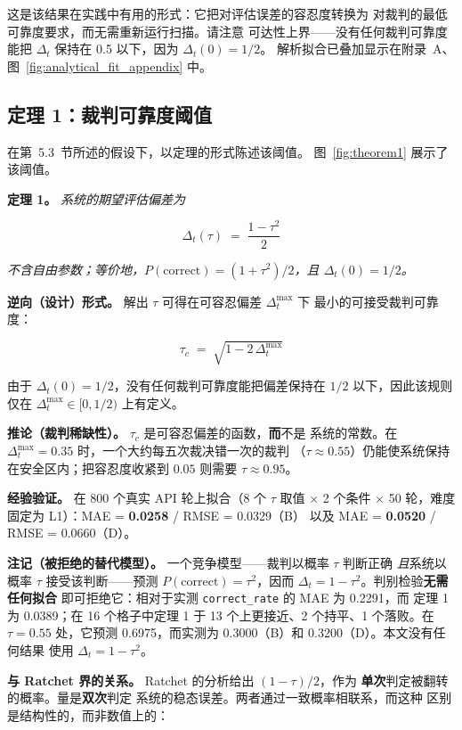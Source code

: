 这是该结果在实践中有用的形式：它把对评估误差的容忍度转换为
对裁判的最低可靠度要求，而无需重新运行扫描。请注意
可达性上界——没有任何裁判可靠度能把 $\Delta_t$ 保持在 0.5 以下，因为 $\Delta_t(0) = 1/2$。
解析拟合已叠加显示在附录~A、图~\ref{fig:analytical_fit_appendix} 中。

\subsection{定理 1：裁判可靠度阈值}
\label{sec:theorem1}

在第~5.3~节所述的假设下，以定理的形式陈述该阈值。
图~\ref{fig:theorem1} 展示了该阈值。

\textbf{定理 1。} \textit{系统的期望评估偏差为}

\[
  \Delta_t(\tau) \;=\; \frac{1-\tau^{2}}{2}
\]

\textit{不含自由参数；等价地，$P(\text{correct}) = (1+\tau^{2})/2$，且
$\Delta_t(0) = 1/2$。}

\textbf{逆向（设计）形式。} 解出 $\tau$ 可得在可容忍偏差 $\Delta_t^{\max}$ 下
最小的可接受裁判可靠度：

\[
  \tau_c \;=\; \sqrt{1 - 2\,\Delta_t^{\max}}
\]

由于 $\Delta_t(0) = 1/2$，没有任何裁判可靠度能把偏差保持在 $1/2$ 以下，因此该规则
仅在 $\Delta_t^{\max} \in [0, 1/2)$ 上有定义。

\textbf{推论（裁判稀缺性）。} $\tau_c$ 是可容忍偏差的函数，\textbf{而}不是
系统的常数。在 $\Delta_t^{\max} = 0.35$ 时，一个大约每五次裁决错一次的裁判
（$\tau \approx 0.55$）仍能使系统保持在安全区内；把容忍度收紧到
$0.05$ 则需要 $\tau \approx 0.95$。

\textbf{经验验证。} 在 800 个真实 API 轮上拟合（8 个 $\tau$ 取值 $\times$ 2
个条件 $\times$ 50 轮，难度固定为 L1）：MAE = \textbf{0.0258} / RMSE = 0.0329（B）
以及 MAE = \textbf{0.0520} / RMSE = 0.0660（D）。

\textbf{注记（被拒绝的替代模型）。} 一个竞争模型——裁判以概率 $\tau$ 判断正确
\textit{且}系统以概率 $\tau$ 接受该判断——预测
$P(\text{correct}) = \tau^{2}$，因而 $\Delta_t = 1-\tau^{2}$。判别检验\textbf{无需任何拟合}
即可拒绝它：相对于实测 \texttt{correct\_rate} 的 MAE 为 0.2291，而
定理 1 为 0.0389；在 16 个格子中定理 1 于 13 个上更接近、2 个持平、1 个落败。在
$\tau = 0.55$ 处，它预测 0.6975，而实测为 0.3000（B）和 0.3200（D）。本文没有任何结果
使用 $\Delta_t = 1-\tau^{2}$。

\textbf{与 Ratchet 界的关系。} Ratchet 的分析给出 $(1 - \tau)/2$，作为
\textbf{单次}判定被翻转的概率。量是\textbf{双次}判定
系统的稳态误差。两者通过一致概率相联系，而这种
区别是结构性的，而非数值上的：

